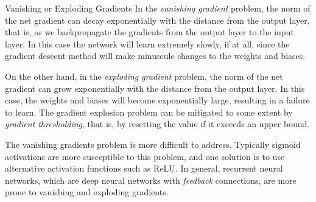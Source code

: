 %
\begin{frame}{Vanishing or Exploding Gradients}
In the {\em vanishing gradient} problem, the norm of the net gradient can
decay exponentially with the distance from the output layer, that is, as
we backpropagate the gradients from the output layer to the input layer.
In this case the network will learn extremely slowly, if at all, since
the gradient descent method will make minuscule changes to the weights
and biases. 

\medskip

On the other hand, in the {\em exploding gradient} problem, 
the norm of the net gradient can grow exponentially
with the distance from the output layer. In this case, the weights and
biases will become exponentially large, resulting in a failure to learn.
The gradient explosion problem can be mitigated to some extent 
by {\em gradient thresholding}, that is, by resetting the value if it
exceeds an upper bound. 

\medskip

The vanishing gradients problem is more
difficult to address. Typically sigmoid activations are more susceptible
to this problem, and one solution is to use alternative activation
functions such as ReLU. In general, recurrent neural networks, which 
are deep neural networks with {\em feedback} connections, are more prone to
vanishing and exploding gradients.%
\end{frame}

